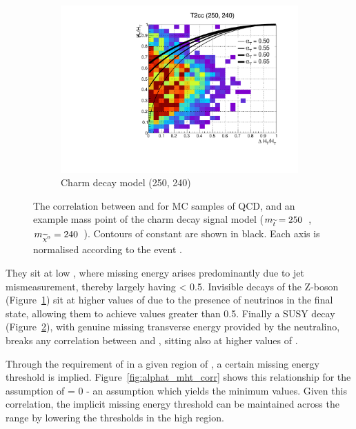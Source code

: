 \begin{figure}[b!]
\begin{subfigure}[t]{.46\textwidth}
    \caption{\zinv}
    \label{fig:alphat_corr_zinv}
  \end{subfigure}\\
  \begin{subfigure}[t]{.46\textwidth}
    \includegraphics[width=\textwidth]
    {Figs/alphat/alphat_correlation_T2cc_250_240_ge4j_done3.pdf}
    \caption{Charm decay model (250, 240)}
    \label{fig:alphat_corr_t2cc}
  \end{subfigure}
  \caption{The correlation between \mht and \deltaHT for MC samples of QCD,
  \zinv and an example mass point of the charm decay signal model ($m_{\widetilde{t}} =
  250$~\gev, $m_{\widetilde{\chi}^{0}} = 240$~\gev). Contours of constant \alphat are shown in
  black. Each axis is normalised according to the event \HT.}
  \label{fig:alphat_corr}
\end{figure}
%
They
sit at low \mht, where missing energy arises predominantly due to jet
mismeasurement, thereby largely having \alphat < 0.5. Invisible decays of the Z-boson
(Figure~\ref{fig:alphat_corr_zinv}) sit at higher values of \mht due to the
presence of neutrinos in the final state, allowing them to achieve \alphat values
greater than 0.5. Finally a SUSY decay (Figure~\ref{fig:alphat_corr_t2cc}), with
genuine missing transverse energy provided by the neutralino, breaks any correlation
between \mht and \deltaHT, sitting also at higher values of \alphat.


Through the requirement of \alphat in a given region of \HT, a certain missing
energy threshold is implied. Figure~\ref{fig:alphat_mht_corr} shows this
relationship for
the assumption of \deltaHT = 0 - an assumption which yields the minimum \mht
values. Given this correlation, the implicit missing energy threshold can be
maintained across the \HT range by lowering the \alphat thresholds in the high
\HT
region.

